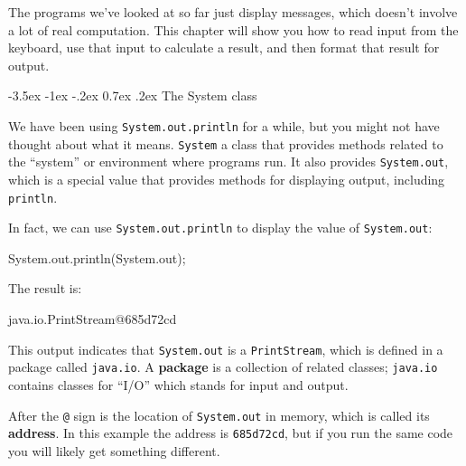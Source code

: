 \documentclass[12pt]{book}
\makeatletter
\theoremstyle{exercise}
\newcommand{\java}[1]{\verb"#1"}
\renewcommand{\section}{\@startsection{section}{1}{\z@}%
    {-3.5ex \@plus -1ex \@minus -.2ex}%
    {0.7ex \@plus.2ex}%
    {\normalfont\Large\bfseries}}
\newcommand{\java}[1]{\lstinline{#1}} %
\makeatother
\begin{document}


The programs we've looked at so far just display messages, which doesn't involve a lot of real computation.
This chapter will show you how to read input from the keyboard, use that input to calculate a result, and then format that result for output.


\section{The System class}
\label{sec:system}


We have been using {\tt System.out.println} for a while, but you might not have thought about what it means.
\java{System} a class that provides methods related to the ``system'' or environment where programs run.
It also provides \java{System.out}, which is a special value that provides methods for displaying output, including \java{println}.

In fact, we can use \java{System.out.println} to display the value of \java{System.out}:

\begin{code}
    System.out.println(System.out);
\end{code}

The result is:

\begin{stdout}
java.io.PrintStream@685d72cd
\end{stdout}


This output indicates that \java{System.out} is a \java{PrintStream}, which is defined in a package called \java{java.io}.
A {\bf package} is a collection of related classes; \java{java.io} contains classes for ``I/O'' which stands for input and output.


After the {\tt @} sign is the location of \java{System.out} in memory, which is called its {\bf address}.
In this example the address is \java{685d72cd}, but if you run the same code you will likely get something different.
\end{document}
